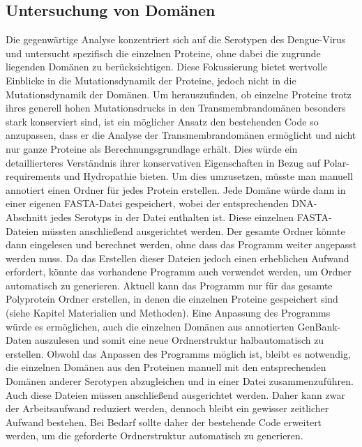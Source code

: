 \documentclass[german,version-2022-01]{uzl-thesis}
\begin{document}
\subsection{Untersuchung von Dom\"anen}
Die gegenw\"artige Analyse konzentriert sich auf die Serotypen des Dengue-Virus und untersucht spezifisch die einzelnen Proteine, ohne dabei die zugrunde liegenden Dom\"anen zu ber\"ucksichtigen. Diese Fokussierung bietet wertvolle Einblicke in die Mutationsdynamik der Proteine, jedoch nicht in die Mutationsdynamik der Dom\"anen. Um herauszufinden, ob einzelne Proteine trotz ihres generell hohen Mutationsdrucks in den Transmembrandom\"anen besonders stark konserviert sind, ist ein m\"oglicher Ansatz den bestehenden Code so anzupassen, dass er die Analyse der Transmembrandom\"anen erm\"oglicht und nicht nur ganze Proteine als Berechnungsgrundlage erh\"alt. Dies w\"urde ein detaillierteres Verst\"andnis ihrer konservativen Eigenschaften in Bezug auf Polar-requirements und Hydropathie bieten. Um dies umzusetzen, m\"usste man manuell annotiert einen Ordner f\"ur jedes Protein erstellen. Jede Dom\"ane w\"urde dann in einer eigenen FASTA-Datei gespeichert, wobei der entsprechenden DNA-Abschnitt jedes Serotyps in der Datei enthalten ist. Diese einzelnen FASTA-Dateien m\"ussten anschlie\ss{}end ausgerichtet werden. Der gesamte Ordner k\"onnte dann eingelesen und berechnet werden, ohne dass das Programm weiter angepasst werden muss. Da das Erstellen dieser Dateien jedoch einen erheblichen Aufwand erfordert, k\"onnte das vorhandene Programm auch verwendet werden, um Ordner automatisch zu generieren. Aktuell kann das Programm nur f\"ur das gesamte Polyprotein Ordner erstellen, in denen die einzelnen Proteine gespeichert sind (siehe Kapitel Materialien und Methoden). Eine Anpassung des Programms w\"urde es erm\"oglichen, auch die einzelnen Dom\"anen aus annotierten GenBank-Daten auszulesen und somit eine neue Ordnerstruktur halbautomatisch zu erstellen. Obwohl das Anpassen des Programms m\"oglich ist, bleibt es notwendig, die einzelnen Dom\"anen aus den Proteinen manuell mit den entsprechenden Dom\"anen anderer Serotypen abzugleichen und in einer Datei zusammenzuf\"uhren. Auch diese Dateien m\"ussen anschlie\ss{}end ausgerichtet werden. Daher kann zwar der Arbeitsaufwand reduziert werden, dennoch bleibt ein gewisser zeitlicher Aufwand bestehen. Bei Bedarf sollte daher der bestehende Code erweitert werden, um die geforderte Ordnerstruktur automatisch zu generieren.
\end{document}
